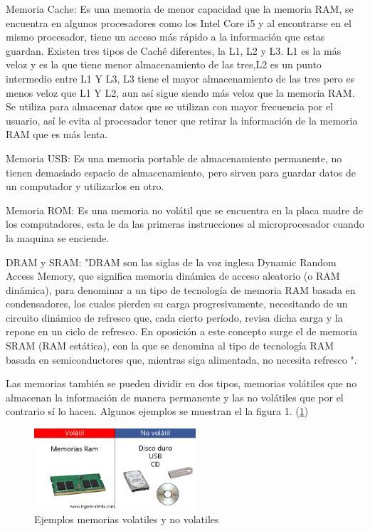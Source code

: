 \documentclass{article}
\begin{document}
Memoria Cache: Es una memoria de menor capacidad que la memoria RAM, se encuentra en algunos procesadores como los Intel Core i5 y al encontrarse en el mismo procesador, tiene un acceso más rápido a la información que estas guardan. Existen tres tipos de Caché diferentes, la L1, L2 y L3. L1 es la más veloz y es la que tiene menor almacenamiento de las tres,L2 es un punto intermedio entre L1 Y L3, L3 tiene el mayor almacenamiento de las tres pero es menos veloz que L1 Y L2, aun así sigue siendo más veloz que la memoria RAM. Se utiliza para almacenar datos que se utilizan con mayor frecuencia por el usuario, así le evita al procesador tener que retirar la información de la memoria RAM que es más lenta.\cite{YouBioit}

Memoria USB: Es una memoria portable de almacenamiento permanente, no tienen demasiado espacio de almacenamiento, pero sirven para guardar datos de un computador y utilizarlos en otro.

Memoria ROM: Es una memoria no volátil que se encuentra en la placa madre de los computadores, esta le da las primeras instrucciones al microprocesador cuando la maquina se enciende.

DRAM y SRAM: "DRAM son las siglas de la voz inglesa Dynamic Random Access Memory, que significa memoria dinámica de acceso aleatorio (o RAM dinámica), para denominar a un tipo de tecnología de memoria RAM basada en condensadores, los cuales pierden su carga progresivamente, necesitando de un circuito dinámico de refresco que, cada cierto período, revisa dicha carga y la repone en un ciclo de refresco. En oposición a este concepto surge el de memoria SRAM (RAM estática), con la que se denomina al tipo de tecnología RAM basada en semiconductores que, mientras siga alimentada, no necesita refresco \cite{mateoa-volta}". 

Las memorias también se pueden dividir en dos tipos, memorias volátiles que no almacenan la información de manera permanente y las no volátiles que por el contrario sí lo hacen. Algunos ejemplos se muestran el la figura 1. (\ref{fig:Volatilidad})\\

\begin{figure}[h]
\includegraphics[width=6cm]{Volatilidad.jpg}
\centering
\caption{Ejemplos memorias volatiles y no volatiles}
\label{fig:Volatilidad}
\end{figure}
\end{document}
